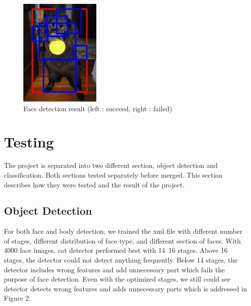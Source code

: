 \documentclass[conference,compsoc]{IEEEtran}
\begin{document}
\begin{figure}
\begin{multicols}{4}
    		\includegraphics[height=1.3\linewidth]{smolrect2.jpg}\par
	\end{multicols}
	\caption{Face detection result (left : succeed, right : failed)}
\end{figure}


\section{Testing}
The project is separated into two different section, object detection and classification. Both sections tested separately before merged. This section describes how they were tested and the result of the project.
\subsection{Object Detection}
For both face and body detection, we trained the xml file with different number of stages, different distribution of face type, and different section of faces. With 4000 face images, cat detector performed best with 14~16 stages. Above 16 stages, the detector could not detect anything frequently. Below 14 stages, the detector includes wrong features and add unnecessary part which fails the purpose of face detection. Even with the optimized stages, we still could see detector detects wrong features and adds unnecessary parts which is addressed in Figure 2. 
\end{document}
